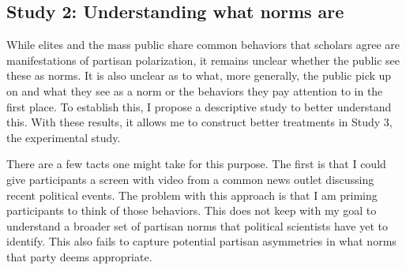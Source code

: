 \documentclass [12pt]{article}
\begin{document}
\subsection{Study 2: Understanding what norms are}

While elites and the mass public share common behaviors that scholars agree are manifestations of partisan polarization, it remains unclear whether the public see these as norms. It is also unclear as to what, more generally, the public pick up on and what they see as a norm or the behaviors they pay attention to in the first place. To establish this, I propose a descriptive study to better understand this. With these results, it allows me to construct better treatments in Study 3, the experimental study. 

There are a few tacts one might take for this purpose. The first is that I could give participants a screen with video from a common news outlet discussing recent political events. The problem with this approach is that I am priming participants to think of those behaviors. This does not keep with my goal to understand a broader set of partisan norms that political scientists have yet to identify. This also fails to capture potential partisan asymmetries in what norms that party deems appropriate. 
\end{document}
